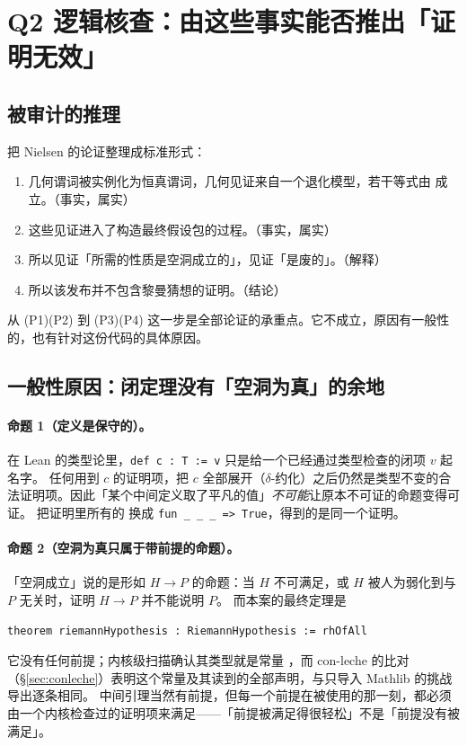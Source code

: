 \section{Q2 逻辑核查：由这些事实能否推出「证明无效」}
\label{sec:logic}

\subsection{被审计的推理}

把 Nielsen 的论证整理成标准形式：

\begin{notebox}
\begin{enumerate}[label=(P\arabic*),leftmargin=3em]
\item 几何谓词被实例化为恒真谓词，几何见证来自一个退化模型，若干等式由  成立。\hfill（事实，属实）
\item 这些见证进入了构造最终假设包的过程。\hfill（事实，属实）
\item 所以见证「所需的性质是空洞成立的」，见证「是废的」。\hfill（解释）
\item 所以该发布并不包含黎曼猜想的证明。\hfill（结论）
\end{enumerate}
\end{notebox}

从 (P1)(P2) 到 (P3)(P4) 这一步是全部论证的承重点。它不成立，原因有一般性的，也有针对这份代码的具体原因。

\subsection{一般性原因：闭定理没有「空洞为真」的余地}

\paragraph{命题 1（定义是保守的）。}在 Lean 的类型论里，\texttt{def c : T := v} 只是给一个已经通过类型检查的闭项 $v$ 起名字。
任何用到 $c$ 的证明项，把 $c$ 全部展开（$\delta$-约化）之后仍然是类型不变的合法证明项。因此「某个中间定义取了平凡的值」\emph{不可能}让原本不可证的命题变得可证。
把证明里所有的  换成 \texttt{fun \_ \_ \_ => True}，得到的是同一个证明。

\paragraph{命题 2（空洞为真只属于带前提的命题）。}「空洞成立」说的是形如 $H \to P$ 的命题：当 $H$ 不可满足，或 $H$ 被人为弱化到与 $P$ 无关时，证明 $H\to P$ 并不能说明 $P$。
而本案的最终定理是
\begin{Verbatim}[fontsize=\small,frame=single,rulecolor=\color{gray!50}]
theorem riemannHypothesis : RiemannHypothesis := rhOfAll
\end{Verbatim}
\noindent 它没有任何前提；内核级扫描确认其类型就是常量 ，而 con-leche 的比对（\S\ref{sec:conleche}）表明这个常量及其读到的全部声明，与只导入 Mathlib 的挑战导出逐条相同。
中间引理当然有前提，但每一个前提在被使用的那一刻，都必须由一个内核检查过的证明项来满足——「前提被满足得很轻松」不是「前提没有被满足」。

